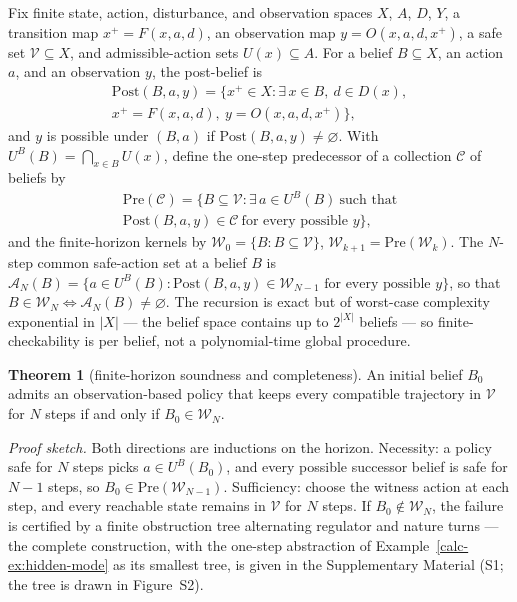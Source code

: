 \documentclass[10pt,twocolumn]{article}
\theoremstyle{definition}
\newtheorem{theorem}{Theorem}
\begin{document}
Fix finite state, action, disturbance, and observation spaces \(X\),
\(A\), \(D\), \(Y\), a transition map \(x^+ = F(x,a,d)\), an observation
map \(y = O(x,a,d,x^+)\), a safe set \(\mathcal V\subseteq X\), and
admissible-action sets \(U(x)\subseteq A\). For a belief \(B\subseteq X\),
an action \(a\), and an observation \(y\), the post-belief is
\[
\begin{gathered}
\mathrm{Post}(B,a,y) = \bigl\{ x^+\in X : \exists\, x\in B,\ d\in D(x), \\
x^+ = F(x,a,d),\ y = O(x,a,d,x^+) \bigr\},
\end{gathered}
\]
and \(y\) is possible under \((B,a)\) if \(\mathrm{Post}(B,a,y)\neq\varnothing\).
With \(U^B(B)=\bigcap_{x\in B}U(x)\), define the one-step predecessor of a
collection \(\mathcal C\) of beliefs by
\[
\begin{gathered}
\mathrm{Pre}(\mathcal C) = \bigl\{ B\subseteq\mathcal V : \exists\, a\in U^B(B)\ \text{such that}\\
\mathrm{Post}(B,a,y)\in\mathcal C\ \text{for every possible } y \bigr\},
\end{gathered}
\]
and the finite-horizon kernels by \(\mathcal W_0 = \{B : B\subseteq\mathcal V\}\),
\(\mathcal W_{k+1} = \mathrm{Pre}(\mathcal W_k)\).
The \(N\)-step common safe-action set at a belief \(B\) is
\(\mathcal{A}_N(B) = \bigl\{ a \in U^B(B) : \mathrm{Post}(B,a,y) \in \mathcal W_{N-1} \text{ for every possible } y \bigr\}\),
so that \(B \in \mathcal W_N \iff \mathcal{A}_N(B) \neq \varnothing\). The recursion is exact but of worst-case complexity exponential in
\(|X|\) --- the belief space contains up to \(2^{|X|}\) beliefs --- so
finite-checkability is per belief, not a polynomial-time global procedure.

\begin{theorem}[finite-horizon soundness and completeness]\label{calc-thm:finite-horizon}
An initial belief \(B_0\) admits an observation-based policy that keeps
every compatible trajectory in \(\mathcal V\) for \(N\) steps if and only
if \(B_0\in\mathcal W_N\).
\end{theorem}

\emph{Proof sketch.} Both directions are inductions on the horizon. Necessity: a policy safe for \(N\) steps picks \(a \in U^B(B_0)\), and every possible successor belief is safe for \(N - 1\) steps, so \(B_0 \in \mathrm{Pre}(\mathcal{W}_{N-1})\). Sufficiency: choose the witness action at each step, and every reachable state remains in \(\mathcal{V}\) for \(N\) steps. If \(B_0 \notin \mathcal{W}_N\), the failure is certified by a finite obstruction tree alternating regulator and nature turns --- the complete construction, with the one-step abstraction of Example~\ref{calc-ex:hidden-mode} as its smallest tree, is given in the Supplementary Material (S1; the tree is drawn in Figure~S2).
\end{document}
